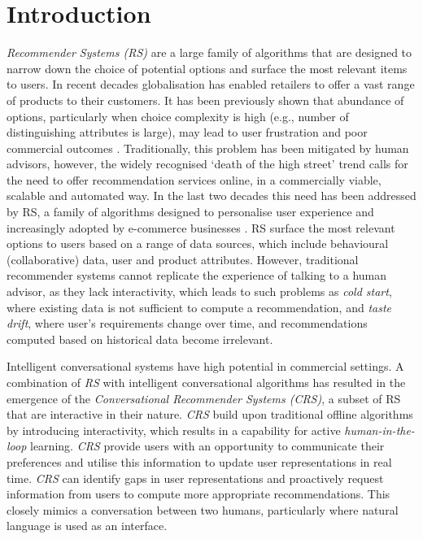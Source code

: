 \chapter{Introduction}
\label{ch:into} %

\textit{Recommender Systems (RS)} are a large family of algorithms that are designed to narrow down the choice of potential options and surface the most relevant items to users. In recent decades globalisation has enabled retailers to offer a vast range of products to their customers. It has been previously shown that abundance of options, particularly when choice complexity is high (e.g., number of distinguishing attributes is large), may lead to user frustration and poor commercial outcomes \citep{greifeneder2010less}. Traditionally, this problem has been mitigated by human advisors, however, the widely recognised ‘death of the high street’ trend calls for the need to offer recommendation services online, in a commercially viable, scalable and automated way. In the last two decades this need has been addressed by RS, a family of algorithms designed to personalise user experience and increasingly adopted by e-commerce businesses \citep{chandrashekara2018fuzzy, kucherbaev2017chatbots, zhao2013interactive}. RS surface the most relevant options to users based on a range of data sources, which include behavioural (collaborative) data, user and product attributes. However, traditional recommender systems cannot replicate the experience of talking to a human advisor, as they lack interactivity, which leads to such problems as \textit{cold start}, where existing data is not sufficient to compute a recommendation, and \textit{taste drift}, where user’s requirements change over time, and recommendations computed based on historical data become irrelevant. 

Intelligent conversational systems have high potential in commercial settings. A combination of \textit{RS} with intelligent conversational algorithms has resulted in the emergence of the \textit{Conversational Recommender Systems (CRS)}, a subset of RS that are interactive in their nature. \textit{CRS} build upon traditional offline algorithms by introducing interactivity, which results in a capability for active \textit{human-in-the-loop} learning.  \textit{CRS} provide users with an opportunity to communicate their preferences and utilise this information to update user representations in real time.  \textit{CRS} can identify gaps in user representations and proactively request information from users to compute more appropriate recommendations. This closely mimics a conversation between two humans, particularly where natural language is used as an interface.

